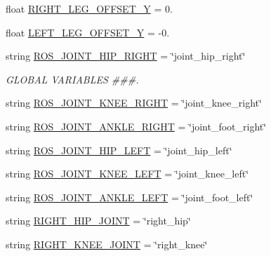 \begin{DoxyCompactItemize}
\item 
float \mbox{\hyperlink{namespacecapture__pedal__trajectory_abc5f034cd21c3878a3d10594ad89e589}{R\+I\+G\+H\+T\+\_\+\+L\+E\+G\+\_\+\+O\+F\+F\+S\+E\+T\+\_\+Y}} = 0.
\item 
float \mbox{\hyperlink{namespacecapture__pedal__trajectory_a624e3b2ffb27de7ac8ef0f742d2902c5}{L\+E\+F\+T\+\_\+\+L\+E\+G\+\_\+\+O\+F\+F\+S\+E\+T\+\_\+Y}} = -\/0.
\item 
string \mbox{\hyperlink{namespacecapture__pedal__trajectory_ace3bd5ff6f7bfb6e65aadc4487a89ffe}{R\+O\+S\+\_\+\+J\+O\+I\+N\+T\+\_\+\+H\+I\+P\+\_\+\+R\+I\+G\+HT}} = \char`\"{}joint\+\_\+hip\+\_\+right\char`\"{}
\begin{DoxyCompactList}\small\item\em G\+L\+O\+B\+AL V\+A\+R\+I\+A\+B\+L\+ES \#\#\#. \end{DoxyCompactList}\item 
string \mbox{\hyperlink{namespacecapture__pedal__trajectory_a79c63fa5ca37fc7f030568dfe7079f73}{R\+O\+S\+\_\+\+J\+O\+I\+N\+T\+\_\+\+K\+N\+E\+E\+\_\+\+R\+I\+G\+HT}} = \char`\"{}joint\+\_\+knee\+\_\+right\char`\"{}
\item 
string \mbox{\hyperlink{namespacecapture__pedal__trajectory_ae399b4f7124a1cd67c10a5ff5a0efba5}{R\+O\+S\+\_\+\+J\+O\+I\+N\+T\+\_\+\+A\+N\+K\+L\+E\+\_\+\+R\+I\+G\+HT}} = \char`\"{}joint\+\_\+foot\+\_\+right\char`\"{}
\item 
string \mbox{\hyperlink{namespacecapture__pedal__trajectory_af2271fa55dd911979e17d7a7bd891e42}{R\+O\+S\+\_\+\+J\+O\+I\+N\+T\+\_\+\+H\+I\+P\+\_\+\+L\+E\+FT}} = \char`\"{}joint\+\_\+hip\+\_\+left\char`\"{}
\item 
string \mbox{\hyperlink{namespacecapture__pedal__trajectory_a2573f1326727542b82629e3ba73f57fd}{R\+O\+S\+\_\+\+J\+O\+I\+N\+T\+\_\+\+K\+N\+E\+E\+\_\+\+L\+E\+FT}} = \char`\"{}joint\+\_\+knee\+\_\+left\char`\"{}
\item 
string \mbox{\hyperlink{namespacecapture__pedal__trajectory_a07733166d6384f69b9880e18c9c70fb3}{R\+O\+S\+\_\+\+J\+O\+I\+N\+T\+\_\+\+A\+N\+K\+L\+E\+\_\+\+L\+E\+FT}} = \char`\"{}joint\+\_\+foot\+\_\+left\char`\"{}
\item 
string \mbox{\hyperlink{namespacecapture__pedal__trajectory_a82263d3cb2967d2b210c72d013362610}{R\+I\+G\+H\+T\+\_\+\+H\+I\+P\+\_\+\+J\+O\+I\+NT}} = \char`\"{}right\+\_\+hip\char`\"{}
\item 
string \mbox{\hyperlink{namespacecapture__pedal__trajectory_a13c6b4844291f74230c8fa8376e4c14f}{R\+I\+G\+H\+T\+\_\+\+K\+N\+E\+E\+\_\+\+J\+O\+I\+NT}} = \char`\"{}right\+\_\+knee\char`\"{}

\end{DoxyCompactItemize}
